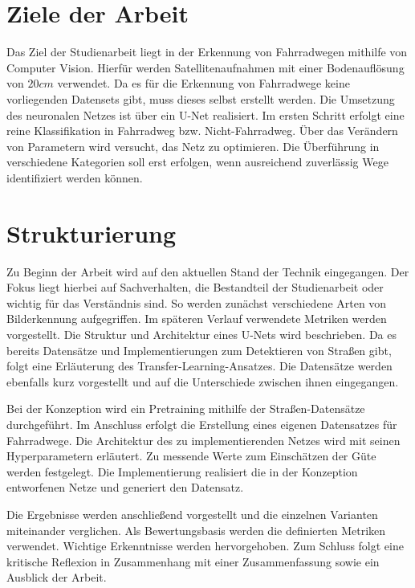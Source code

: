 \section{Ziele der Arbeit} \label{mot:ziele}
Das Ziel der Studienarbeit liegt in der Erkennung von Fahrradwegen mithilfe von Computer Vision.
Hierfür werden Satellitenaufnahmen mit einer Bodenauflösung von $20 cm$ verwendet.
Da es für die Erkennung von Fahrradwege keine vorliegenden Datensets gibt, muss dieses selbst erstellt werden.
Die Umsetzung des neuronalen Netzes ist über ein U-Net realisiert.
Im ersten Schritt erfolgt eine reine Klassifikation in Fahrradweg bzw. Nicht-Fahrradweg.
Über das Verändern von Parametern wird versucht, das Netz zu optimieren.
Die Überführung in verschiedene Kategorien soll erst erfolgen, wenn ausreichend zuverlässig Wege identifiziert werden können.

\section{Strukturierung} \label{mot:strukt}

Zu Beginn der Arbeit wird auf den aktuellen Stand der Technik eingegangen.
Der Fokus liegt hierbei auf Sachverhalten, die Bestandteil der Studienarbeit oder wichtig für das Verständnis sind.
So werden zunächst verschiedene Arten von Bilderkennung aufgegriffen.
Im späteren Verlauf verwendete Metriken werden vorgestellt.
Die Struktur und Architektur eines U-Nets wird beschrieben.
Da es bereits Datensätze und Implementierungen zum Detektieren von Straßen gibt, folgt eine Erläuterung des Transfer-Learning-Ansatzes.
Die Datensätze werden ebenfalls kurz vorgestellt und auf die Unterschiede zwischen ihnen eingegangen.

Bei der Konzeption wird ein Pretraining mithilfe der Straßen-Datensätze durchgeführt.
Im Anschluss erfolgt die Erstellung eines eigenen Datensatzes für Fahrradwege.
Die Architektur des zu implementierenden Netzes wird mit seinen Hyperparametern erläutert.
Zu messende Werte zum Einschätzen der Güte werden festgelegt.
Die Implementierung realisiert die in der Konzeption entworfenen Netze und generiert den Datensatz.

Die Ergebnisse werden anschließend vorgestellt und die einzelnen Varianten miteinander verglichen.
Als Bewertungsbasis werden die definierten Metriken verwendet.
Wichtige Erkenntnisse werden hervorgehoben. Zum Schluss folgt eine kritische Reflexion in Zusammenhang mit einer Zusammenfassung sowie ein Ausblick der Arbeit.

